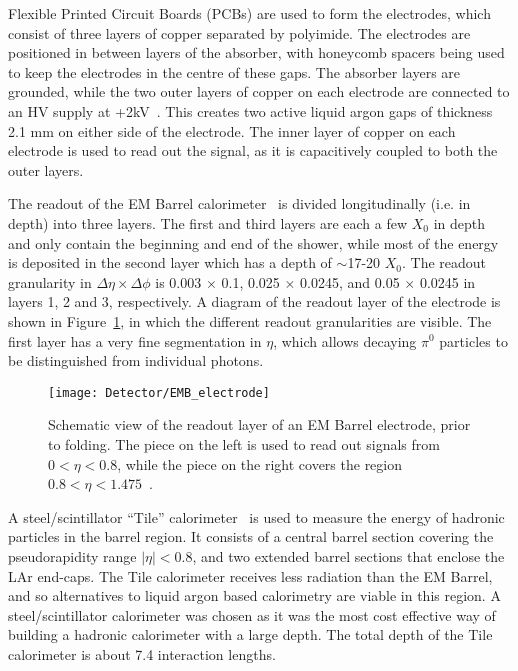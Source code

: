 Flexible Printed Circuit Boards (PCBs) are used to form the electrodes, which consist of three layers of copper separated by polyimide. The electrodes are positioned in between layers of the absorber, with honeycomb spacers being used to keep the electrodes in the centre of these gaps. The absorber layers are grounded, while the two outer layers of copper on each electrode are connected to an HV supply at +2kV~\cite{detector_paper}. This creates two active liquid argon gaps of thickness 2.1 mm on either side of the electrode. The inner layer of copper on each electrode is used to read out the signal, as it is capacitively coupled to both the outer layers.


The readout of the EM Barrel calorimeter~\cite{ATLAS_barrel_electrode} is divided longitudinally (i.e. in depth) into three layers. The first and third layers are each a few $X_0$ in depth and only contain the beginning and end of the shower, while most of the energy is deposited in the second layer which has a depth of $\sim$17-20 $X_0$. The readout granularity in $\Delta \eta \times \Delta \phi$ is 0.003 $\times$ 0.1, 0.025 $\times$ 0.0245, and 0.05 $\times$ 0.0245 in layers 1, 2 and 3, respectively. A diagram of the readout layer of the electrode is shown in Figure~\ref{fig_EMB_electrode}, in which the different readout granularities are visible. The first layer has a very fine segmentation in $\eta$, which allows decaying $\pi^0$ particles to be distinguished from individual photons.

\begin{figure}[tb]
\begin{center}
\texttt{[image: Detector/EMB\_electrode]}
\end{center}
\caption[Readout layer of EMB electrode]{Schematic view of the readout layer of an EM Barrel electrode, prior to folding. The piece on the left is used to read out signals from $0 < \eta < 0.8$, while the piece on the right covers the region $0.8 < \eta < 1.475$~\cite{ATLAS_barrel_electrode}.}
\label{fig_EMB_electrode}
\end{figure}






A steel/scintillator ``Tile'' calorimeter~\cite{ATLAS_TILE_TDR} is used to measure the energy of hadronic particles in the barrel region. It consists of a central barrel section covering the pseudorapidity range $|\eta| < 0.8$, and two extended barrel sections that enclose the LAr end-caps. 
The Tile calorimeter receives less radiation than the EM Barrel, and so alternatives to liquid argon based calorimetry are viable in this region. A steel/scintillator calorimeter was chosen as it was the most cost effective way of building a hadronic calorimeter with a large depth\cite{detector_paper}. The total depth of the Tile calorimeter is about 7.4 interaction lengths.

